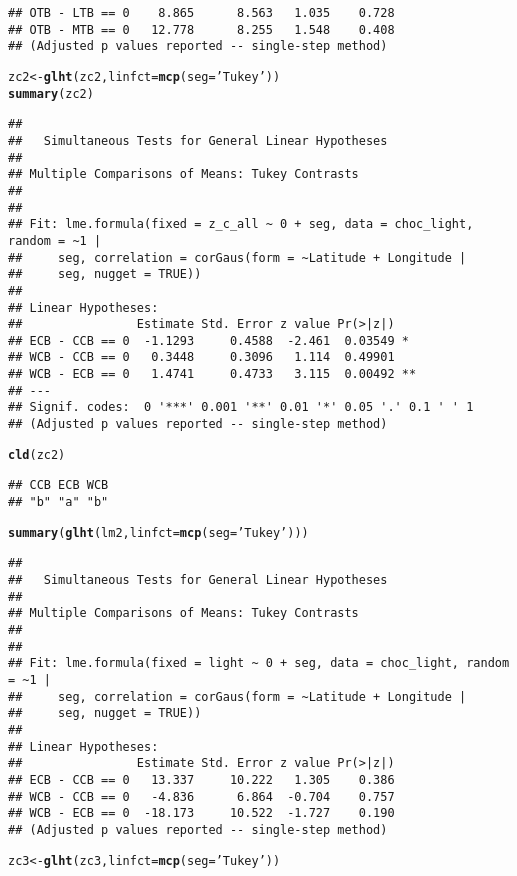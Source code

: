 \documentclass[letterpaper,12pt]{article}\usepackage[]{graphicx}\usepackage[]{color}
\makeatletter
\newcommand{\hlstr}[1]{\textcolor[rgb]{0.192,0.494,0.8}{#1}}%
\newcommand{\hlstd}[1]{\textcolor[rgb]{0.345,0.345,0.345}{#1}}%
\newcommand{\hlkwb}[1]{\textcolor[rgb]{0.69,0.353,0.396}{#1}}%
\newcommand{\hlkwc}[1]{\textcolor[rgb]{0.333,0.667,0.333}{#1}}%
\newcommand{\hlkwd}[1]{\textcolor[rgb]{0.737,0.353,0.396}{\textbf{#1}}}%
\newenvironment{kframe}{%
 \def\at@end@of@kframe{}%
 \ifinner\ifhmode%
  \def\at@end@of@kframe{\end{minipage}}%
  \begin{minipage}{\columnwidth}%
 \fi\fi%
 \def\FrameCommand##1{\hskip\@totalleftmargin \hskip-\fboxsep
 \colorbox{shadecolor}{##1}\hskip-\fboxsep
     \hskip-\linewidth \hskip-\@totalleftmargin \hskip\columnwidth}%
 \MakeFramed {\advance\hsize-\width
   \@totalleftmargin\z@ \linewidth\hsize
   \@setminipage}}%
 {\par\unskip\endMakeFramed%
 \at@end@of@kframe}
\newenvironment{knitrout}{}{} %
\makeatother
\begin{document}
\begin{knitrout}
\begin{kframe}
\begin{verbatim}
## OTB - LTB == 0    8.865      8.563   1.035    0.728
## OTB - MTB == 0   12.778      8.255   1.548    0.408
## (Adjusted p values reported -- single-step method)
\end{verbatim}
\begin{alltt}
\hlstd{zc2} \hlkwb{<-} \hlkwd{glht}\hlstd{(zc2,} \hlkwc{linfct} \hlstd{=} \hlkwd{mcp}\hlstd{(}\hlkwc{seg} \hlstd{=} \hlstr{'Tukey'}\hlstd{))}
\hlkwd{summary}\hlstd{(zc2)}
\end{alltt}
\begin{verbatim}
## 
## 	 Simultaneous Tests for General Linear Hypotheses
## 
## Multiple Comparisons of Means: Tukey Contrasts
## 
## 
## Fit: lme.formula(fixed = z_c_all ~ 0 + seg, data = choc_light, random = ~1 | 
##     seg, correlation = corGaus(form = ~Latitude + Longitude | 
##     seg, nugget = TRUE))
## 
## Linear Hypotheses:
##                Estimate Std. Error z value Pr(>|z|)   
## ECB - CCB == 0  -1.1293     0.4588  -2.461  0.03549 * 
## WCB - CCB == 0   0.3448     0.3096   1.114  0.49901   
## WCB - ECB == 0   1.4741     0.4733   3.115  0.00492 **
## ---
## Signif. codes:  0 '***' 0.001 '**' 0.01 '*' 0.05 '.' 0.1 ' ' 1
## (Adjusted p values reported -- single-step method)
\end{verbatim}
\begin{alltt}
\hlkwd{cld}\hlstd{(zc2)}
\end{alltt}
\begin{verbatim}
## CCB ECB WCB 
## "b" "a" "b"
\end{verbatim}
\begin{alltt}
\hlkwd{summary}\hlstd{(}\hlkwd{glht}\hlstd{(lm2,} \hlkwc{linfct} \hlstd{=} \hlkwd{mcp}\hlstd{(}\hlkwc{seg} \hlstd{=} \hlstr{'Tukey'}\hlstd{)))}
\end{alltt}
\begin{verbatim}
## 
## 	 Simultaneous Tests for General Linear Hypotheses
## 
## Multiple Comparisons of Means: Tukey Contrasts
## 
## 
## Fit: lme.formula(fixed = light ~ 0 + seg, data = choc_light, random = ~1 | 
##     seg, correlation = corGaus(form = ~Latitude + Longitude | 
##     seg, nugget = TRUE))
## 
## Linear Hypotheses:
##                Estimate Std. Error z value Pr(>|z|)
## ECB - CCB == 0   13.337     10.222   1.305    0.386
## WCB - CCB == 0   -4.836      6.864  -0.704    0.757
## WCB - ECB == 0  -18.173     10.522  -1.727    0.190
## (Adjusted p values reported -- single-step method)
\end{verbatim}
\begin{alltt}
\hlstd{zc3} \hlkwb{<-} \hlkwd{glht}\hlstd{(zc3,} \hlkwc{linfct} \hlstd{=} \hlkwd{mcp}\hlstd{(}\hlkwc{seg} \hlstd{=} \hlstr{'Tukey'}\hlstd{))}

\end{alltt}
\end{kframe}
\end{knitrout}
\end{document}
